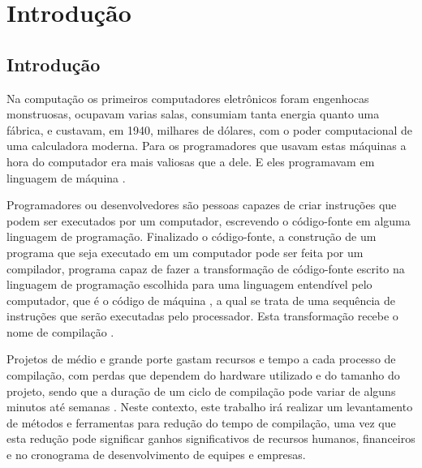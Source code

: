 \part{Introdução}

\chapter*[Introdução]{Introdução}

Na computação os primeiros computadores eletrônicos foram engenhocas
 monstruosas, ocupavam varias salas, consumiam tanta energia quanto
 uma fábrica, e custavam, em 1940, milhares de dólares, com o poder
 computacional de uma calculadora moderna. Para os
 programadores que usavam estas máquinas a hora do computador era
 mais valiosas que a dele. E eles programavam em linguagem de
 máquina \cite[pag.5]{ref6}.

Programadores ou desenvolvedores são pessoas capazes de criar instruções
 que podem ser executados por um computador, escrevendo o código-fonte em
 alguma linguagem de programação. Finalizado o código-fonte, a construção
 de um programa que seja executado em um computador pode ser feita por um
 compilador, programa capaz de fazer a transformação de
 código-fonte escrito na linguagem de programação escolhida para uma linguagem
 entendível pelo computador, que é o código de máquina \cite[pag.5]{ref6}, a qual
 se trata de uma sequência de instruções que serão executadas  pelo
 processador. Esta transformação recebe o nome de compilação \cite[pag.1]{ref5}.

Projetos de médio e grande porte gastam recursos e tempo a cada processo
 de compilação, com perdas que dependem do hardware utilizado e do tamanho
 do projeto, sendo que a duração de um ciclo de compilação pode variar de
 alguns minutos até semanas \cite[pag.5]{ref6}. Neste contexto, este trabalho
 irá realizar um levantamento de métodos e ferramentas para redução do
 tempo de compilação, uma vez que esta redução pode significar ganhos
 significativos de recursos humanos, financeiros e no cronograma de
 desenvolvimento de equipes e empresas. 



